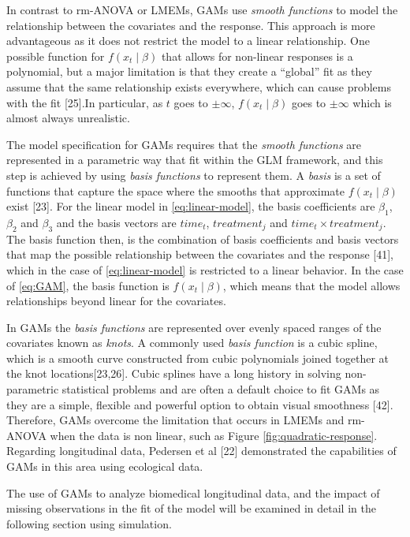 \documentclass[
]{article}
\begin{document}
In contrast to rm-ANOVA or LMEMs, GAMs use \emph{smooth functions} to model the relationship between the covariates and the response. This approach is more advantageous as it does not restrict the model to a linear relationship. One possible function for \(f(x_t\mid \beta)\) that allows for non-linear responses is a polynomial, but a major limitation is that they create a ``global'' fit as they assume that the same relationship exists everywhere, which can cause problems with the fit {[}25{]}.In particular, as \(t\) goes to \(\pm \infty\), \(f(x_t \mid \beta)\) goes to \(\pm \infty\) which is almost always unrealistic.

The model specification for GAMs requires that the \emph{smooth functions} are represented in a parametric way that fit within the GLM framework, and this step is achieved by using \emph{basis functions} to represent them. A \emph{basis} is a set of functions that capture the space where the smooths that approximate \(f(x_t \mid \beta)\) exist {[}23{]}. For the linear model in \eqref{eq:linear-model}, the basis coefficients are \(\beta_1\), \(\beta_2\) and \(\beta_3\) and the basis vectors are \(time_t\), \(treatment_j\) and \(time_t \times treatment_j\). The basis function then, is the combination of basis coefficients and basis vectors that map the possible relationship between the covariates and the response {[}41{]}, which in the case of \eqref{eq:linear-model} is restricted to a linear behavior. In the case of \eqref{eq:GAM}, the basis function is \(f(x_t\mid \beta)\), which means that the model allows relationships beyond linear for the covariates.

In GAMs the \emph{basis functions} are represented over evenly spaced ranges of the covariates known as \emph{knots}. A commonly used \emph{basis function} is a cubic spline, which is a smooth curve constructed from cubic polynomials joined together at the knot locations{[}23,26{]}. Cubic splines have a long history in solving non-parametric statistical problems and are often a default choice to fit GAMs as they are a simple, flexible and powerful option to obtain visual smoothness {[}42{]}. Therefore, GAMs overcome the limitation that occurs in LMEMs and rm-ANOVA when the data is non linear, such as Figure \ref{fig:quadratic-response}. Regarding longitudinal data, Pedersen et al {[}22{]} demonstrated the capabilities of GAMs in this area using ecological data.

The use of GAMs to analyze biomedical longitudinal data, and the impact of missing observations in the fit of the model will be examined in detail in the following section using simulation.
\end{document}
